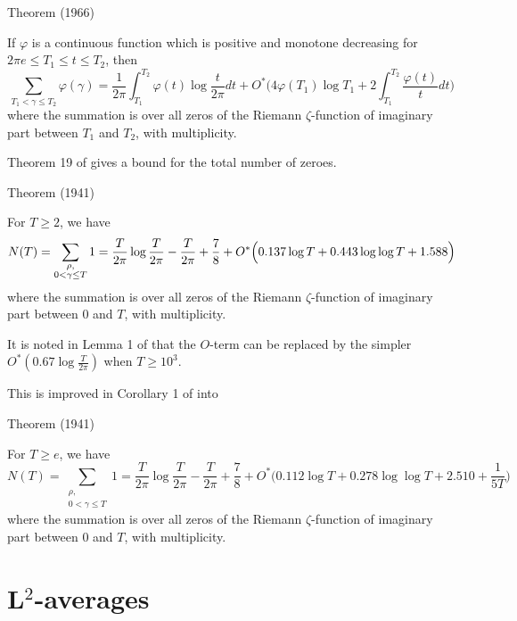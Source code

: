\begin{thm}{Theorem (1966)}

If $\varphi$ is a continuous function which is positive and monotone
decreasing for $2\pi e\le T_1\le t\le T_2$, then
$$
\sum_{T_1 < \gamma\le T_2} \varphi(\gamma)
            =\frac{1}{2\pi}\int_{T_1}^{T_2}\varphi(t)\log\frac{t}{2\pi}dt
            +O^*\biggl(4\varphi(T_1)\log
            T_1+2\int_{T_1}^{T_2}\frac{\varphi(t)}{t}
            dt\biggr)
            $$
             where the summation is over all zeros of the Riemann
            $\zeta$-function of
            imaginary part between $T_1$ and $T_2$, with multiplicity.
\end{thm}


Theorem 19 of
\cite{Rosser*41}
gives a bound for the total number of zeroes.

\begin{thm}{Theorem (1941)}

For $T\ge2$, we have
$$
N(T)=\sum_{\substack{\rho,\\ 0 < \gamma\le T}} 1=
            \frac{T}{2\pi}\log\frac{T}{2\pi}-\frac{T}{2\pi}+\frac{7}{8}
            +O^*\Bigl(0.137\log T+0.443\log\log T+1.588
            \Bigr)
            $$
            where the summation is over all zeros of the Riemann
            $\zeta$-function of
            imaginary part between 0 and $T$, with multiplicity.
\end{thm}


It is noted in Lemma 1 of
\cite{Ramare-Saouter*02}
that the $O$-term can be replaced by the simpler
$O^*(0.67\log\frac{T}{2\pi})$ when $T\ge 10^3$.

This is improved in Corollary 1 of
\cite{Trudgian*13}
into
\begin{thm}{Theorem (1941)}

For $T\ge e$, we have
$$
N(T)=\sum_{\substack{\rho,\\ 0 < \gamma\le T}} 1=
            \frac{T}{2\pi}\log\frac{T}{2\pi}-\frac{T}{2\pi}+\frac{7}{8}
            +O^*\bigl(0.112\log T+0.278\log\log T+2.510+\frac{1}{5T}
            \bigr)
            $$
            where the summation is over all zeros of the Riemann
            $\zeta$-function of
            imaginary part between 0 and $T$, with multiplicity.
\end{thm}






\par 
\section{L${}^2$-averages}


